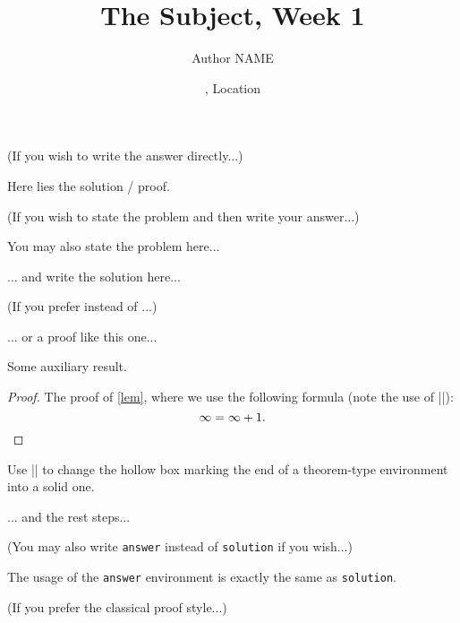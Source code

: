 \documentclass[11pt,
  logo = {example-image},
  title in boldface,
  theorem in new line,
]{homework}
\title{The Subject, Week 1}
\author{Author NAME}
\date{\TheDate{2023-12-25}, Location}
\begin{document}
\textcolor{gray!55}{(If you wish to write the answer directly...)}

\begin{problem}
    Here lies the solution / proof.
\end{problem}


\bigskip\textcolor{gray!55}{(If you wish to state the problem and then write your answer...)}

\begin{problem}
    You may also state the problem here...
\end{problem}

\begin{solution}
    ... and write the solution here...
\end{solution}

\bigskip\textcolor{gray!55}{(If you prefer  instead of ...)}

\begin{solution}[Proof]
    ... or a proof like this one...
    \begin{lemma}\label{lem}
        Some auxiliary result.
    \end{lemma}
    \begin{proof}
        The proof of \cref{lem}, where we use the following formula (note the use of \cverb|\qedhere|):
        \[
            \infty = \infty + 1.
            \qedhere %
        \]
    \end{proof}
    \begin{fact}
        \proofless
        Use \cverb|\proofless| to change the hollow box marking the end of a theorem-type environment into a solid one.
    \end{fact}
    ... and the rest steps...
\end{solution}


\bigskip\textcolor{gray!55}{(You may also write \texttt{answer} instead of \texttt{solution} if you wish...)}

\begin{answer}
    The usage of the \verb|answer| environment is exactly the same as \verb|solution|.
\end{answer}


\enlargethispage*{\baselineskip}


\bigskip\textcolor{gray!55}{(If you prefer the classical proof style...)}
\end{document}
